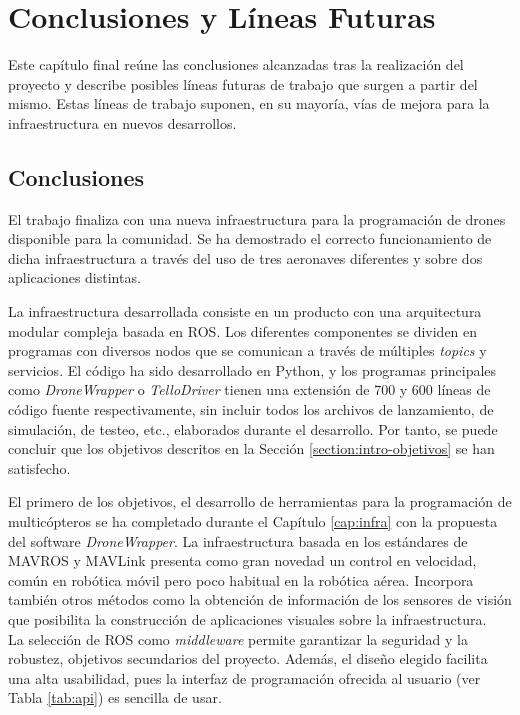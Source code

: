 \documentclass[../main.tex]{subfiles}
\begin{document}
\chapter{Conclusiones y Líneas Futuras} \label{cap:concl}
Este capítulo final reúne las conclusiones alcanzadas tras la realización del proyecto y describe posibles líneas futuras de trabajo que surgen a partir del mismo. Estas líneas de trabajo suponen, en su mayoría, vías de mejora para la infraestructura en nuevos desarrollos.

\section{Conclusiones} \label{section:concl}
El trabajo finaliza con una nueva infraestructura para la programación de drones disponible para la comunidad. Se ha demostrado el correcto funcionamiento de dicha infraestructura a través del uso de tres aeronaves diferentes y sobre dos aplicaciones distintas.

La infraestructura desarrollada consiste en un producto con una arquitectura modular compleja basada en ROS. Los diferentes componentes se dividen en programas con diversos nodos que se comunican a través de múltiples \emph{topics} y servicios. El código ha sido desarrollado en Python, y los programas principales como \emph{DroneWrapper} o \emph{TelloDriver} tienen una extensión de 700 y 600 líneas de código fuente respectivamente, sin incluir todos los archivos de lanzamiento, de simulación, de testeo, etc., elaborados durante el desarrollo. Por tanto, se puede concluir que los objetivos descritos en la Sección \ref{section:intro-objetivos} se han satisfecho.

El primero de los objetivos, el desarrollo de herramientas para la programación de multicópteros se ha completado durante el Capítulo \ref{cap:infra} con la propuesta del software \emph{DroneWrapper}. La infraestructura basada en los estándares de MAVROS y MAVLink presenta como gran novedad un control en velocidad, común en robótica móvil pero poco habitual en la robótica aérea. Incorpora también otros métodos como la obtención de información de los sensores de visión que posibilita la construcción de aplicaciones visuales sobre la infraestructura. \\
La selección de ROS como \emph{middleware} permite garantizar la seguridad y la robustez, objetivos secundarios del proyecto. Además, el diseño elegido facilita una alta usabilidad, pues la interfaz de programación ofrecida al usuario (ver Tabla \ref{tab:api}) es sencilla de usar.
\end{document}
